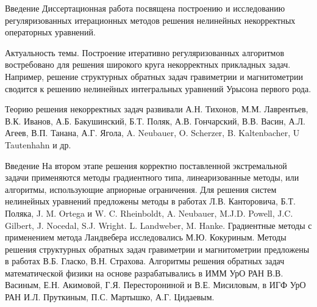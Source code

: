\documentclass[10pt,pdf, mathserif, hyperref={unicode}]{beamer}
\begin{document}
\begin{frame}{Введение}
	Диссертационная работа посвящена построению и исследованию  регуляризованных итерационных методов решения нелинейных некорректных операторных уравнений.
	
	\smallskip
	{\color{blue}Актуальность темы.} Построение итеративно регуляризованных алгоритмов востребовано для решения широкого круга некорректных прикладных задач. Например, решение структурных обратных задач гравиметрии и магнитометрии сводится к решению нелинейных интегральных уравнений Урысона первого рода.
	
	\smallskip
	Теорию решения некорректных задач развивали А.Н. Тихонов, М.М. Лаврентьев, В.К. Иванов, А.Б. Бакушинский, Б.Т. Поляк, А.В. Гончарский, В.В. Васин, А.Л. Агеев, В.П. Танана, А.Г. Ягола, A. Neubauer, O. Scherzer, B. Kaltenbacher, U Tautenhahn и др.
	
\end{frame}
\begin{frame}{Введение}
	На втором этапе решения корректно поставленной экстремальной задачи применяются методы градиентного типа, линеаризованные методы, или алгоритмы, использующие  априорные ограничения.
	Для решения систем нелинейных уравнений предложены методы в работах Л.В. Канторовича, Б.Т. Поляка, J. M. Ortega и W. C. Rheinboldt,	A. Neubauer, M.J.D. Powell, 	J.C. Gilbert, J. Nocedal, S.J. Wright.
	L. Landweber, M. Hanke. Градиентные методы с применением
	метода Ландвебера исследовались М.Ю. Кокуриным.
	Методы решения структурных обратных задач гравиметрии и магнитометрии предложены в работах В.Б. Гласко, В.Н. Страхова. Алгоритмы решения обратных задач
	математической физики на основе разрабатывались в ИММ УрО РАН В.В. Васиным, Е.Н. Акимовой, Г.Я. Пересторониной и В.Е. Мисиловым, в ИГФ УрО РАН И.Л. Пруткиным, П.С. Мартышко, А.Г. Цидаевым.
\end{frame}
\end{document}

